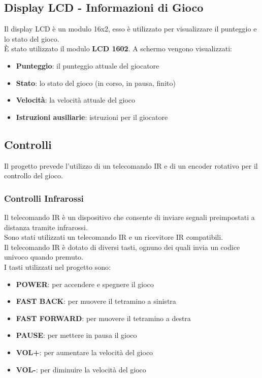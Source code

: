 \documentclass[a4paper, 12pt]{article}
\begin{document}
\subsection{Display LCD - Informazioni di Gioco}
Il display LCD è un modulo 16x2, esso è utilizzato per visualizzare il punteggio e lo stato del gioco.\\
È stato utilizzato il modulo \textbf{LCD 1602}.
A schermo vengono visualizzati:
\begin{itemize}
    \item \textbf{Punteggio}: il punteggio attuale del giocatore
    \item \textbf{Stato}: lo stato del gioco (in corso, in pausa, finito)
    \item \textbf{Velocità}: la velocità attuale del gioco
    \item \textbf{Istruzioni ausiliarie}: istruzioni per il giocatore
\end{itemize}

\subsection{Controlli}
Il progetto prevede l'utilizzo di un telecomando IR e di un encoder rotativo per il controllo del gioco.\\

\subsubsection{Controlli Infrarossi}
Il telecomando IR è un dispositivo che consente di inviare segnali preimpostati a distanza tramite infrarossi.\\
Sono stati utilizzati un telecomando IR e un ricevitore IR compatibili.\\
Il telecomando IR è dotato di diversi tasti, ognuno dei quali invia un codice univoco quando premuto.\\
I tasti utilizzati nel progetto sono:
\begin{itemize}
    \item \textbf{POWER}: per accendere e spegnere il gioco
    \item \textbf{FAST BACK}: per muovere il tetramino a sinistra
    \item \textbf{FAST FORWARD}: per muovere il tetramino a destra
    \item \textbf{PAUSE}: per mettere in pausa il gioco
    \item \textbf{VOL+}: per aumentare la velocità del gioco
    \item \textbf{VOL-}: per diminuire la velocità del gioco
\end{itemize}
\end{document}
